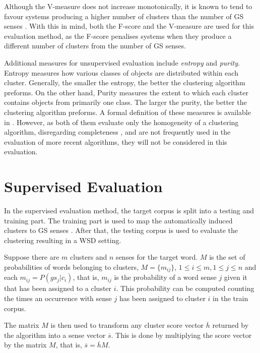 Although the V-measure does not increase monotonically, it is known to tend to
favour systems producing a higher number of clusters than the number of \ac{GS}
senses \cite{manandhar2010semeval}. With this in mind, both the F-score and the
V-measure are used for this evaluation method, as the F-score penalises systems
when they produce a different number of clusters from the number of \ac{GS}
senses.

Additional measures for unsupervised evaluation include \textit{entropy} and
\textit{purity}. Entropy measures how various classes of objects are
distributed within each cluster. Generally, the smaller the entropy, the better
the clustering algorithm preforms. On the other hand, Purity measures the extent
to which each cluster contains objects from primarily one class. The larger the
purity, the better the clustering algorithm preforms. A formal definition of
these measures is available in \cite{zhao2005hierarchical}. However, as both of
them evaluate only the homogeneity of a clustering algorithm, disregarding
completeness \cite{manandhar2009semeval}, and are not frequently used in the
evaluation of more recent algorithms, they will not be considered in this
evaluation.

\section{Supervised Evaluation}
\label{sec:supeval}

In the supervised evaluation method, the target corpus is split into a testing
and training part. The training part is used to map the automatically induced
clusters to \ac{GS} senses \cite{agirre2006evaluating}. After that, the testing
corpus is used to evaluate the clustering resulting in a \ac{WSD} setting.

Suppose there are $m$ clusters and $n$ senses for the target word. $M$ is the
set of probabilities of words belonging to clusters, $M = \{m_{ij}\}$, $1 \leq i
\leq m, 1 \leq j \leq n$ and each $m_{ij} = P(gs_j|c_i)$, that is, $m_{ij}$ is
the probability of a word sense $j$ given it that has been assigned to a cluster
$i$. This probability can be computed counting the times an occurrence with
sense $j$ has been assigned to cluster $i$ in the train corpus.

The matrix $M$ is then used to transform any cluster score vector $\overline{h}$
returned by the algorithm into a sense vector $\overline{s}$. This is done by
multiplying the score vector by the matrix $M$, that is, $\overline{s} =
\overline{h}M$.

